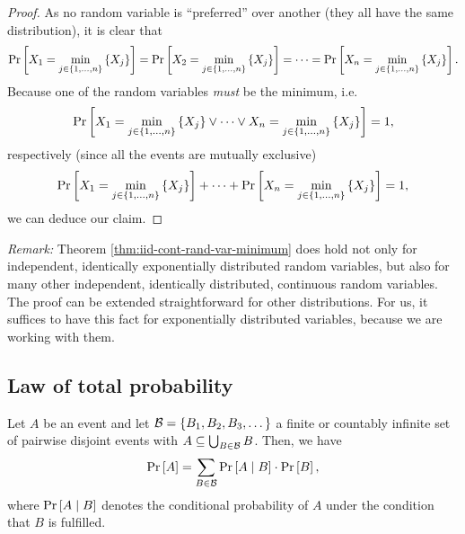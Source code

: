 \begin{proof}
  As no random variable is ``preferred'' over another (they all have the same distribution), it is clear that
  \begin{equation*}
    \operatorname{Pr}\left[X_1 = \min_{j\in\left\{ 1,\dots,n \right\}}\left\{ X_j \right\}\right] = \operatorname{Pr}\left[X_2 = \min_{j\in\left\{ 1,\dots,n \right\}}\left\{ X_j \right\}\right] = \dots = \operatorname{Pr}\left[X_n = \min_{j\in\left\{ 1,\dots,n \right\}}\left\{ X_j \right\}\right].
  \end{equation*}
  Because one of the random variables \emph{must} be the minimum, i.e.
  \begin{equation*}
    \operatorname{Pr}\left[
      X_1 = \min_{j\in\left\{ 1,\dots,n \right\}}\left\{ X_j \right\} \vee
      \dots \vee
      X_n = \min_{j\in\left\{ 1,\dots,n \right\}}\left\{ X_j \right\}
    \right] = 1,
  \end{equation*}
  respectively (since all the events are mutually exclusive)
  \begin{equation*}
    \operatorname{Pr}\left[
      X_1 = \min_{j\in\left\{ 1,\dots,n \right\}}\left\{ X_j \right\}
    \right] + 
    \dots +
    \operatorname{Pr}\left[
      X_n = \min_{j\in\left\{ 1,\dots,n \right\}}\left\{ X_j \right\}
    \right] = 1,
  \end{equation*}
  we can deduce our claim.
\end{proof}

\emph{Remark:} Theorem \ref{thm:iid-cont-rand-var-minimum} does hold not only for independent, identically exponentially distributed random variables, but also for many other independent, identically distributed, continuous random variables. The proof can be extended straightforward for other distributions. For us, it suffices to have this fact for exponentially distributed variables, because we are working with them.

\subsection{Law of total probability}
\label{sec:theory-law-total-probability}

\begin{theorem}
  \label{theo:law-total-prob}
  Let $A$ be an event and let ${\cal B}=\left\{ B_1,B_2,B_3,\dots \right\}$ a finite or countably infinite set of pairwise disjoint events with $A \subseteq \bigcup_{B \in {\cal B}} B$. Then, we have
  \begin{equation*}
    \operatorname{Pr}\left[A\right] = \sum_{B\in{\cal B}} \operatorname{Pr}\left[A \mid B\right] \cdot \operatorname{Pr}\left[B\right],
  \end{equation*}
  where $\operatorname{Pr}\left[A \mid B\right]$ denotes the conditional probability of $A$ under the condition that $B$ is fulfilled.
\end{theorem}

